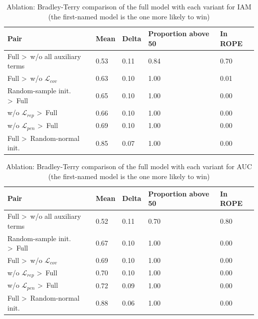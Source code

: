 \begin{table}[H]
\caption{Ablation: Bradley-Terry comparison of the full model with each variant for IAM (the first-named model is the one more likely to win)}
\label{tab:BTablationIAM}
\centering
\scriptsize
\begin{tabular}{@{}lllll@{}}
\toprule
Pair & Mean & Delta & Proportion above 50 & In ROPE \\
\midrule
Full \textgreater\ w/o all auxiliary terms & 0.53 & 0.11 & 0.84 & 0.70 \\
Full \textgreater\ w/o $\mathcal{L}_{cov}$ & 0.63 & 0.10 & 1.00 & 0.01 \\
Random-sample init. \textgreater\ Full & 0.65 & 0.10 & 1.00 & 0.00 \\
w/o $\mathcal{L}_{rep}$ \textgreater\ Full & 0.66 & 0.10 & 1.00 & 0.00 \\
w/o $\mathcal{L}_{pen}$ \textgreater\ Full & 0.69 & 0.10 & 1.00 & 0.00 \\
Full \textgreater\ Random-normal init. & 0.85 & 0.07 & 1.00 & 0.00 \\
\bottomrule
\end{tabular}%
\end{table}

\begin{table}[H]
\caption{Ablation: Bradley-Terry comparison of the full model with each variant for AUC (the first-named model is the one more likely to win)}
\label{tab:BTablationAUC}
\centering
\scriptsize
\begin{tabular}{@{}lllll@{}}
\toprule
Pair & Mean & Delta & Proportion above 50 & In ROPE \\
\midrule
Full \textgreater\ w/o all auxiliary terms & 0.52 & 0.11 & 0.70 & 0.80 \\
Random-sample init. \textgreater\ Full & 0.67 & 0.10 & 1.00 & 0.00 \\
Full \textgreater\ w/o $\mathcal{L}_{cov}$ & 0.69 & 0.10 & 1.00 & 0.00 \\
w/o $\mathcal{L}_{rep}$ \textgreater\ Full & 0.70 & 0.10 & 1.00 & 0.00 \\
w/o $\mathcal{L}_{pen}$ \textgreater\ Full & 0.72 & 0.09 & 1.00 & 0.00 \\
Full \textgreater\ Random-normal init. & 0.88 & 0.06 & 1.00 & 0.00 \\
\bottomrule
\end{tabular}%
\end{table}

